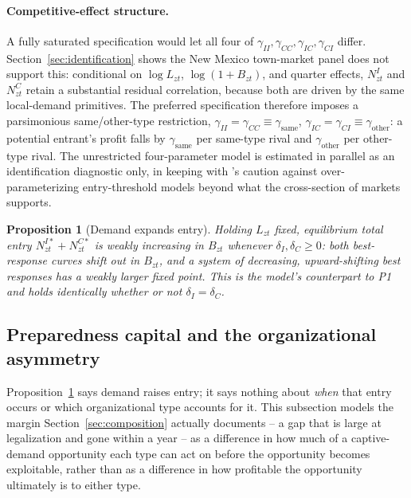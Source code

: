 \documentclass[english,12pt]{article}
\newtheorem{proposition}{Proposition}
\begin{document}
\paragraph{Competitive-effect structure.} A fully saturated specification would let all four of $\gamma_{II}, \gamma_{CC}, \gamma_{IC}, \gamma_{CI}$ differ. Section~\ref{sec:identification} shows the New Mexico town-market panel does not support this: conditional on $\log L_{zt}$, $\log(1+B_{zt})$, and quarter effects, $N^I_{zt}$ and $N^C_{zt}$ retain a substantial residual correlation, because both are driven by the same local-demand primitives. The preferred specification therefore imposes a parsimonious same/other-type restriction, $\gamma_{II}=\gamma_{CC}\equiv\gamma_{\text{same}}$, $\gamma_{IC}=\gamma_{CI}\equiv\gamma_{\text{other}}$: a potential entrant's profit falls by $\gamma_{\text{same}}$ per same-type rival and $\gamma_{\text{other}}$ per other-type rival. The unrestricted four-parameter model is estimated in parallel as an identification diagnostic only, in keeping with \citet{BresnahanReiss1991}'s caution against over-parameterizing entry-threshold models beyond what the cross-section of markets supports.

\begin{proposition}[Demand expands entry]
\label{prop:demandentry}
Holding $L_{zt}$ fixed, equilibrium total entry $N^{I*}_{zt}+N^{C*}_{zt}$ is weakly increasing in $B_{zt}$ whenever $\delta_I,\delta_C\ge0$: both best-response curves shift out in $B_{zt}$, and a system of decreasing, upward-shifting best responses has a weakly larger fixed point. This is the model's counterpart to P1 and holds identically whether or not $\delta_I=\delta_C$.
\end{proposition}

\subsection{Preparedness capital and the organizational asymmetry}
\label{sec:preparedness}

Proposition~\ref{prop:demandentry} says demand raises entry; it says nothing about \emph{when} that entry occurs or which organizational type accounts for it. This subsection models the margin Section~\ref{sec:composition} actually documents -- a gap that is large at legalization and gone within a year -- as a difference in how much of a captive-demand opportunity each type can act on before the opportunity becomes exploitable, rather than as a difference in how profitable the opportunity ultimately is to either type.
\end{document}

